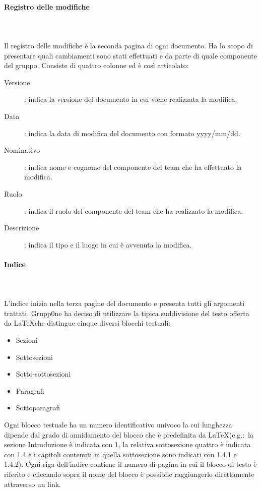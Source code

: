 \documentclass[../norme-di-progetto.tex]{subfiles}
\begin{document}
\paragraph{Registro delle modifiche}\mbox{}\\
\label{par:registro delle modifiche}
\\Il registro delle modifiche è la seconda pagina di ogni documento. Ha lo scopo di presentare quali cambiamenti sono stati effettuati e da parte di quale componente del gruppo. Consiste di quattro colonne ed è così articolato:
\begin{description}
  \item [Versione]: indica la versione del documento in cui viene realizzata la modifica.
  \item [Data]: indica la data di modifica del documento con formato yyyy/mm/dd.
  \item [Nominativo]: indica nome e cognome del componente del team che ha effettuato la modifica.
  \item [Ruolo]: indica il ruolo del componente del team che ha realizzato la modifica.
  \item [Descrizione]: indica il tipo e il luogo in cui è avvenuta la modifica.
\end{description}
\paragraph{Indice}\mbox{}\\
\label{par:indice}
\\L'indice inizia nella terza pagine del documento e presenta tutti gli argomenti trattati. Grupp0ne ha deciso di utilizzare la tipica suddivisione del testo offerta da \LaTeX che distingue cinque diversi blocchi testuali:

\begin{itemize}
  \item Sezioni
  \item Sottosezioni
  \item Sotto-sottosezioni
  \item Paragrafi
  \item Sottoparagrafi
\end{itemize}
Ogni blocco testuale ha un numero identificativo univoco la cui lunghezza dipende dal grado di annidamento del blocco che è predefinita da \LaTeX (e.g.:\ la sezione Introduzione è indicata con 1, la relativa sottosezione quattro è indicata con 1.4 e i capitoli contenuti in quella sottosezione sono indicati con 1.4.1 e 1.4.2).
\newline Ogni riga dell'indice contiene il numero di pagina in cui il blocco di testo è riferito e cliccando sopra il nome del blocco è possibile raggiungerlo direttamente attraverso un link.
\end{document}
